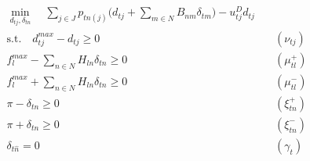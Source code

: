 \documentclass[9pt,a4paper]{article}
\newcommand{\st}{\text{s.t.} \quad}
\begin{document}
\begin{subequations}\label{example:ISO:optimization}
\begin{align}
\min_{d_{tj}, \delta_{tn}} \quad \sum_{j \in J} p_{tn(j)} \big(d_{tj} + \sum_{m \in N} B_{nm} \delta_{tm} \big) - u^D_{tj} d_{tj} &
\label{example:ISO:optimization:objective} \\
	\st d^{max}_{tj} - d_{tj} \geq 0 &\quad (\nu_{tj}) \label{example:ISO:optimization:demand:max} \\[4 pt]
f^{max}_l - \sum_{n \in N} H_{ln} \delta_{tn} \geq 0 &\quad (\mu^+_{tl}) \label{example:ISO:optimization:flow:pos} \\[-2 pt]
f^{max}_l + \sum_{n \in N} H_{ln} \delta_{tn} \geq 0 &\quad (\mu^-_{tl})\label{example:ISO:optimization:flow:neg} \\[-4 pt]
\pi - \delta_{tn} \geq 0 &\quad (\xi^+_{tn}) \label{example:ISO:optimization:angle:pos} \\[2 pt]
\pi + \delta_{tn} \geq 0 &\quad (\xi^-_{tn}) \label{example:ISO:optimization:angle:neg} \\[2 pt]
\delta_{t\hat{n}} = 0  & \quad (\gamma_t) \label{example:ISO:slackbus}
\end{align}
\end{subequations}
\end{document}
